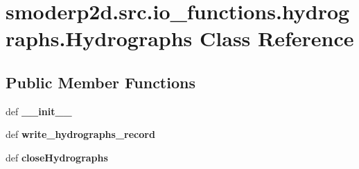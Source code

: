\hypertarget{classsmoderp2d_1_1src_1_1io__functions_1_1hydrographs_1_1Hydrographs}{\section{smoderp2d.\-src.\-io\-\_\-functions.\-hydrographs.\-Hydrographs Class Reference}
\label{classsmoderp2d_1_1src_1_1io__functions_1_1hydrographs_1_1Hydrographs}
}
\subsection*{Public Member Functions}
\begin{DoxyCompactItemize}
\item 
\hypertarget{classsmoderp2d_1_1src_1_1io__functions_1_1hydrographs_1_1Hydrographs_acc52f4f6bb0d17c422ce78fa266c6b2d}{def {\bfseries \-\_\-\-\_\-init\-\_\-\-\_\-}}\label{classsmoderp2d_1_1src_1_1io__functions_1_1hydrographs_1_1Hydrographs_acc52f4f6bb0d17c422ce78fa266c6b2d}

\item 
\hypertarget{classsmoderp2d_1_1src_1_1io__functions_1_1hydrographs_1_1Hydrographs_a29819629062100b2f045751a1a5e7bf1}{def {\bfseries write\-\_\-hydrographs\-\_\-record}}\label{classsmoderp2d_1_1src_1_1io__functions_1_1hydrographs_1_1Hydrographs_a29819629062100b2f045751a1a5e7bf1}

\item 
\hypertarget{classsmoderp2d_1_1src_1_1io__functions_1_1hydrographs_1_1Hydrographs_aea319aedbe9588c46fb1a7d8b6216423}{def {\bfseries close\-Hydrographs}}\label{classsmoderp2d_1_1src_1_1io__functions_1_1hydrographs_1_1Hydrographs_aea319aedbe9588c46fb1a7d8b6216423}

\end{DoxyCompactItemize}
